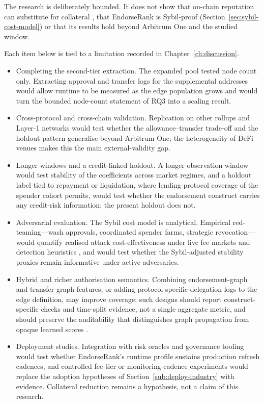 The research is deliberately bounded. It does not show that on-chain reputation can substitute for collateral , that EndorseRank is Sybil-proof (Section~\ref{sec:sybil-cost-model}) or that its results hold beyond Arbitrum One and the studied window.


Each item below is tied to a limitation recorded in Chapter~\ref{ch:discussion}.

\begin{itemize}
\item Completing the second-tier extraction. The expanded pool tested node count only. Extracting approval and transfer logs for the supplemental addresses would allow runtime to be measured as the edge population grows and would turn the bounded node-count statement of RQ3 into a scaling result.
\item Cross-protocol and cross-chain validation. Replication on other rollups and Layer-1 networks would test whether the allowance--transfer trade-off and the holdout pattern generalise beyond Arbitrum One; the heterogeneity of DeFi venues  makes this the main external-validity gap.
\item Longer windows and a credit-linked holdout. A longer observation window would test stability of the coefficients across market regimes, and a holdout label tied to repayment or liquidation, where lending-protocol coverage of the spender cohort permits, would test whether the endorsement construct carries any credit-risk information; the present holdout does not.
\item Adversarial evaluation. The Sybil cost model is analytical. Empirical red-teaming---wash approvals, coordinated spender farms, strategic revocation---would quantify realised attack cost-effectiveness under live fee markets and detection heuristics , and would test whether the Sybil-adjusted stability proxies remain informative under active adversaries.
\item Hybrid and richer authorisation semantics. Combining endorsement-graph and transfer-graph features, or adding protocol-specific delegation logs to the edge definition, may improve coverage; such designs should report construct-specific checks and time-split evidence, not a single aggregate metric, and should preserve the auditability that distinguishes graph propagation from opaque learned scores .
\item Deployment studies. Integration with risk oracles and governance tooling would test whether EndorseRank's runtime profile sustains production refresh cadences, and controlled fee-tier or monitoring-cadence experiments would replace the adoption hypotheses of Section~\ref{sub:deploy-industry} with evidence. Collateral reduction remains a hypothesis, not a claim of this research.
\end{itemize}

